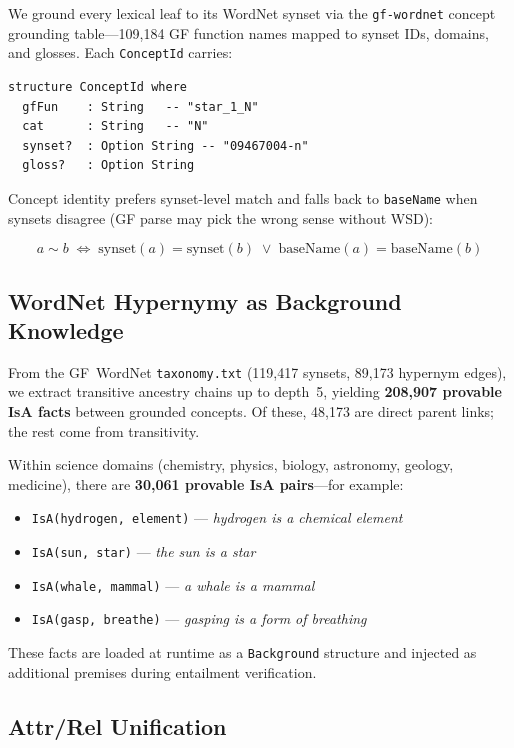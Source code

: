 \documentclass[]{article}
\newcommand{\code}[1]{\texttt{#1}}
\begin{document}
We ground every lexical leaf to its WordNet synset via the
\code{gf-wordnet} concept grounding table---109,184 GF function
names mapped to synset IDs, domains, and glosses.  Each
\code{ConceptId} carries:

\begin{lstlisting}
structure ConceptId where
  gfFun    : String   -- "star_1_N"
  cat      : String   -- "N"
  synset?  : Option String -- "09467004-n"
  gloss?   : Option String
\end{lstlisting}

Concept identity prefers synset-level match and falls back to
\code{baseName} when synsets disagree (GF parse may pick the wrong
sense without WSD):

$$
a \sim b \;\Longleftrightarrow\; \text{synset}(a) = \text{synset}(b)
  \;\lor\; \text{baseName}(a) = \text{baseName}(b)
$$

\subsection{WordNet Hypernymy as Background Knowledge}

From the GF~WordNet \code{taxonomy.txt} (119,417 synsets, 89,173
hypernym edges), we extract transitive ancestry chains up to depth~5,
yielding \textbf{208,907 provable IsA facts} between grounded concepts.
Of these, 48,173 are direct parent links; the rest come from transitivity.

Within science domains (chemistry, physics, biology, astronomy, geology,
medicine), there are \textbf{30,061 provable IsA pairs}---for example:

\begin{itemize}
\item \code{IsA(hydrogen, element)} --- \emph{hydrogen is a chemical element}
\item \code{IsA(sun, star)} --- \emph{the sun is a star}
\item \code{IsA(whale, mammal)} --- \emph{a whale is a mammal}
\item \code{IsA(gasp, breathe)} --- \emph{gasping is a form of breathing}
\end{itemize}

These facts are loaded at runtime as a \code{Background} structure and
injected as additional premises during entailment verification.

\subsection{Attr/Rel Unification}
\end{document}
